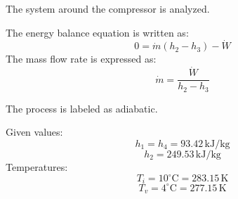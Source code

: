 The system around the compressor is analyzed.  

The energy balance equation is written as:  
\[
0 = \dot{m} (h_2 - h_3) - \dot{W}
\]  
The mass flow rate is expressed as:  
\[
\dot{m} = \frac{\dot{W}}{h_2 - h_3}
\]  

The process is labeled as adiabatic.  

Given values:  
\[
h_1 = h_4 = 93.42 \, \text{kJ/kg}
\]  
\[
h_2 = 249.53 \, \text{kJ/kg}
\]  
Temperatures:  
\[
T_i = 10^\circ\text{C} = 283.15 \, \text{K}
\]  
\[
T_v = 4^\circ\text{C} = 277.15 \, \text{K}
\]